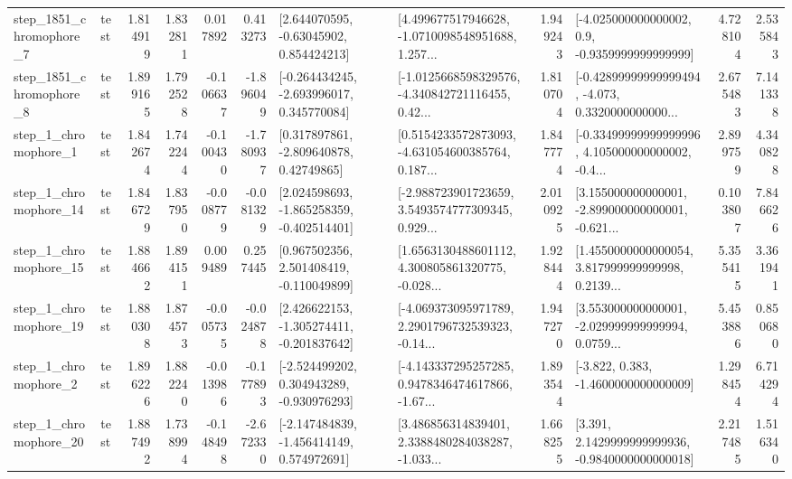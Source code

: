 \begin{tabular}{llrrrrllrlrr}
  step\_1851\_chromophore\_7 &      test &      1.814919 &    1.832811 &      0.017892 &  0.413273 &     [2.644070595, -0.63045902, 0.854424213] &  [4.499677517946628, -1.0710098548951688, 1.257... &       1.949243 &     [-4.025000000000002, 0.9, -0.9359999999999999] &            4.728104 &          2.535843 \\
  step\_1851\_chromophore\_8 &      test &      1.899165 &    1.792528 &     -0.106637 & -1.896049 &   [-0.264434245, -2.693996017, 0.345770084] &  [-1.0125668598329576, -4.340842721116455, 0.42... &       1.810704 &  [-0.42899999999999494, -4.073, 0.3320000000000... &            2.675483 &          7.141338 \\
     step\_1\_chromophore\_1 &      test &      1.842674 &    1.742244 &     -0.100430 & -1.780937 &     [0.317897861, -2.809640878, 0.42749865] &  [0.5154233572873093, -4.631054600385764, 0.187... &       1.847774 &  [-0.33499999999999996, 4.105000000000002, -0.4... &            2.899759 &          4.340828 \\
    step\_1\_chromophore\_14 &      test &      1.846729 &    1.837950 &     -0.008779 & -0.081329 &   [2.024598693, -1.865258359, -0.402514401] &  [-2.988723901723659, 3.5493574777309345, 0.929... &       2.010925 &  [3.155000000000001, -2.899000000000001, -0.621... &            0.103807 &          7.846626 \\
    step\_1\_chromophore\_15 &      test &      1.884662 &    1.894151 &      0.009489 &  0.257445 &    [0.967502356, 2.501408419, -0.110049899] &  [1.6563130488601112, 4.300805861320775, -0.028... &       1.928444 &  [1.4550000000000054, 3.817999999999998, 0.2139... &            5.355415 &          3.361941 \\
    step\_1\_chromophore\_19 &      test &      1.880308 &    1.874573 &     -0.005735 & -0.024878 &   [2.426622153, -1.305274411, -0.201837642] &  [-4.069373095971789, 2.2901796732539323, -0.14... &       1.947270 &  [3.553000000000001, -2.029999999999994, 0.0759... &            5.453886 &          0.850680 \\
     step\_1\_chromophore\_2 &      test &      1.896226 &    1.882240 &     -0.013986 & -0.177893 &   [-2.524499202, 0.304943289, -0.930976293] &  [-4.143337295257285, 0.9478346474617866, -1.67... &       1.893544 &               [-3.822, 0.383, -1.4600000000000009] &            1.298454 &          6.714294 \\
    step\_1\_chromophore\_20 &      test &      1.887492 &    1.738994 &     -0.148498 & -2.672330 &   [-2.147484839, -1.456414149, 0.574972691] &  [3.486856314839401, 2.3388480284038287, -1.033... &       1.668255 &   [3.391, 2.1429999999999936, -0.9840000000000018] &            2.217485 &          1.516340 \\

\end{tabular}
